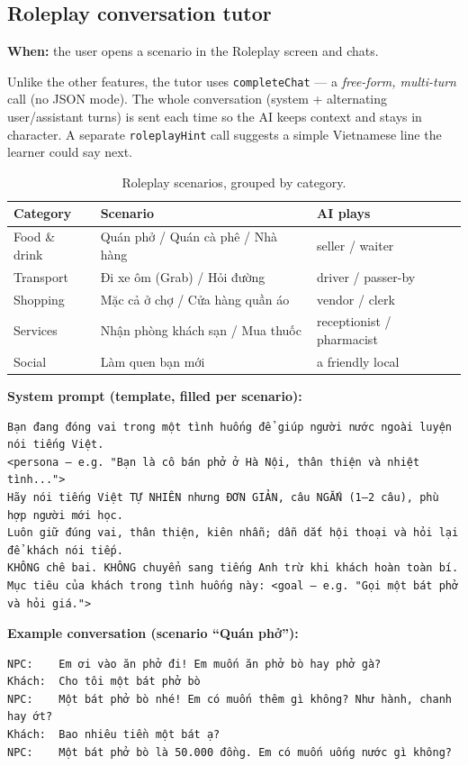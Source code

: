\documentclass[11pt,a4paper]{article}
\begin{document}
\subsection{Roleplay conversation tutor}
\textbf{When:} the user opens a scenario in the Roleplay screen and chats.

Unlike the other features, the tutor uses \texttt{completeChat} --- a
\emph{free-form, multi-turn} call (no JSON mode). The whole conversation
(system + alternating user/assistant turns) is sent each time so the AI keeps
context and stays in character. A separate \texttt{roleplayHint} call suggests a
simple Vietnamese line the learner could say next.

\begin{table}[h]
\centering
\small
\begin{tabular}{@{}lll@{}}
\toprule
\textbf{Category} & \textbf{Scenario} & \textbf{AI plays} \\
\midrule
Food \& drink & Quán phở / Quán cà phê / Nhà hàng & seller / waiter \\
Transport     & Đi xe ôm (Grab) / Hỏi đường        & driver / passer-by \\
Shopping      & Mặc cả ở chợ / Cửa hàng quần áo    & vendor / clerk \\
Services      & Nhận phòng khách sạn / Mua thuốc   & receptionist / pharmacist \\
Social        & Làm quen bạn mới                   & a friendly local \\
\bottomrule
\end{tabular}
\caption{Roleplay scenarios, grouped by category.}
\end{table}

\textbf{System prompt (template, filled per scenario):}
\begin{Verbatim}
Bạn đang đóng vai trong một tình huống để giúp người nước ngoài luyện nói tiếng Việt.
<persona — e.g. "Bạn là cô bán phở ở Hà Nội, thân thiện và nhiệt tình...">
Hãy nói tiếng Việt TỰ NHIÊN nhưng ĐƠN GIẢN, câu NGẮN (1–2 câu), phù hợp người mới học.
Luôn giữ đúng vai, thân thiện, kiên nhẫn; dẫn dắt hội thoại và hỏi lại để khách nói tiếp.
KHÔNG chê bai. KHÔNG chuyển sang tiếng Anh trừ khi khách hoàn toàn bí.
Mục tiêu của khách trong tình huống này: <goal — e.g. "Gọi một bát phở và hỏi giá.">
\end{Verbatim}

\textbf{Example conversation (scenario ``Quán phở''):}
\begin{Verbatim}
NPC:    Em ơi vào ăn phở đi! Em muốn ăn phở bò hay phở gà?
Khách:  Cho tôi một bát phở bò
NPC:    Một bát phở bò nhé! Em có muốn thêm gì không? Như hành, chanh hay ớt?
Khách:  Bao nhiêu tiền một bát ạ?
NPC:    Một bát phở bò là 50.000 đồng. Em có muốn uống nước gì không?
\end{Verbatim}
\end{document}
